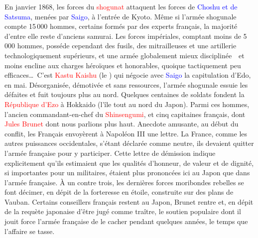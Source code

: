En janvier 1868, les forces du \textcolor{red}{shogunat} attaquent les forces
de \textcolor{blue}{Choshu et de Satsuma}, menées par \textcolor{blue}{Saigo},
à l'entrée de Kyoto. Même si l'armée shogunale compte 15\,000 hommes, certains
formés par des experts français, la majorité d'entre elle reste d'anciens
samurai. Les forces impériales, comptant moins de 5\,000 hommes, posséde
cependant des fusils, des mitrailleuses et une artillerie technologiquement
supérieurs, et une armée globalement mieux disciplinée~\incise~et moins
encline aux charges héroïques et honorables, quoique tactiquement peu
efficaces\dots\ C'est \textcolor{red}{Kastu Kaishu} (le ) qui négocie avec \textcolor{blue}{Saigo} la capitulation d'Edo, en
mai. Désorganisée, démotivée et sans ressources, l'armée shogunale essuie les
défaites et fuit toujours plus au nord. Quelques centaines de soldats fondent
la \textcolor{red}{République d'Ezo }à Hokkaido (l'île tout au nord du Japon).
Parmi ces hommes, l'ancien commandant-en-chef du \textcolor{red}{Shinsengumi},
et cinq capitaines français, dont \textcolor{red}{Jules Brunet} dont nous
parlions plus haut. Anecdote amusante, au début du conflit, les Français
envoyèrent à Napoléon III une lettre. La France, comme les autres puissances
occidentales, s'étant déclarée comme neutre, ils devaient quitter l'armée
française pour y participer. Cette lettre de démission indique explicitement
qu'ils estimaient que les qualités d'honneur, de valeur et de dignité, si
importantes pour un militaires, étaient plus prononcées ici au Japon que dans
l'armée française. À un contre trois, les dernières forces moribondes rebelles
se font décimer, en dépit de la forteresse en étoile, construite sur des plans
de Vauban. Certains conseillers français restent au Japon, Brunet rentre et,
en dépit de la requète japonaise d'être jugé comme traître, le soutien
populaire dont il jouit force l'armée française de le cacher pendant quelques
années, le temps que l'affaire se tasse.

